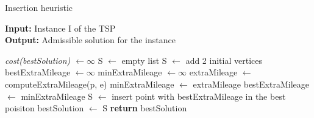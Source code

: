 \begin{algorithm}
	\caption{Insertion heuristic}\label{Insertion method}
	\hspace*{\algorithmicindent} \textbf{Input:} Instance I of the TSP \\
	\hspace*{\algorithmicindent} \textbf{Output:} Admissible solution for the instance
    \begin{algorithmic}[1]
    		\State \textit{cost(bestSolution) $\leftarrow \infty$}
			\State S $\leftarrow$ empty list
			\State S $\leftarrow$ add 2 initial vertices
				\State bestExtraMileage $\leftarrow \infty$
					\State minExtraMileage $\leftarrow \infty$
						\State extraMileage $\leftarrow$ computeExtraMileage(p, e)
							\State minExtraMileage $\leftarrow$ extraMileage
						\EndIf
					\EndFor
						\State bestExtraMileage $\leftarrow$ minExtraMileage
					\EndIf
				\EndFor
				\State S $\leftarrow$ insert point with bestExtraMileage in the best poisiton
			\EndWhile
				\State bestSolution $\leftarrow$ S
			\EndIf
		\EndWhile 
		\State \textbf{return} bestSolution
    \end{algorithmic}
\end{algorithm}

